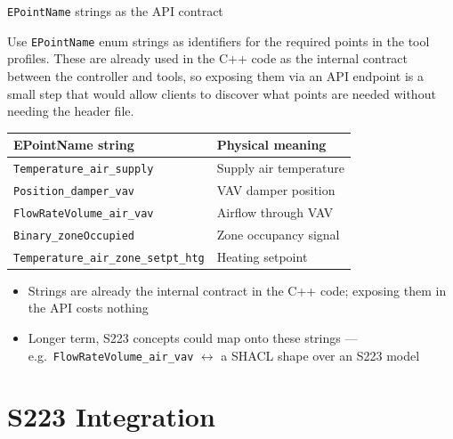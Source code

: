 \documentclass[aspectratio=169]{beamer}
\begin{document}
\begin{frame}{\texttt{EPointName} strings as the API contract}

Use \texttt{EPointName} enum strings as identifiers for the required points in the tool profiles. These are already used in the C++ code as the internal contract between the controller and tools, so exposing them via an API endpoint is a small step that would allow clients to discover what points are needed without needing the header file.

\begin{center}
\footnotesize
\begin{tabular}{p{5.5cm} p{6.5cm}}
\toprule
\textbf{EPointName string} & \textbf{Physical meaning} \\
\midrule
\texttt{Temperature\_air\_supply}   & Supply air temperature \\
\texttt{Position\_damper\_vav}      & VAV damper position \\
\texttt{FlowRateVolume\_air\_vav}   & Airflow through VAV \\
\texttt{Binary\_zoneOccupied}       & Zone occupancy signal \\
\texttt{Temperature\_air\_zone\_setpt\_htg} & Heating setpoint \\
\bottomrule
\end{tabular}
\end{center}

\begin{itemize}\setlength{\itemsep}{0pt}\setlength{\parskip}{0pt}
  \item Strings are already the internal contract in the C++ code; exposing them in the API costs nothing
  \item Longer term, S223 concepts could map onto these strings --- e.g.\ \texttt{FlowRateVolume\_air\_vav} $\leftrightarrow$ a SHACL shape over an S223 model
\end{itemize}

\end{frame}

\section{S223 Integration}
\end{document}
